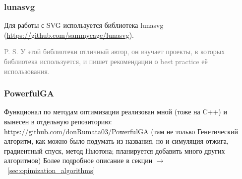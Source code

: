 \subsubsection{lunasvg}
Для работы с SVG используется библиотека lunasvg (\url{https://github.com/sammycage/lunasvg}).

\textcolor{gray}{P. S. У этой библиотеки отличный автор, он изучает проекты, в которых библиотека используется, и пишет рекомендации о best practice её использования.}

\subsubsection{PowerfulGA}
Функционал по методам оптимизации реализован мной (тоже на C++) и вынесен в отдельную репозиторию: \url{https://github.com/donRumata03/PowerfulGA}
(там не только Генетический алгоритм, как можно было подумать из названия, но и симуляция отжига, градиентный спуск, метод Ньютона;
планируется добавить много других алгоритмов)
Более подробное описание в секции $\longrightarrow$~\ref{sec:opimization_algorithms}